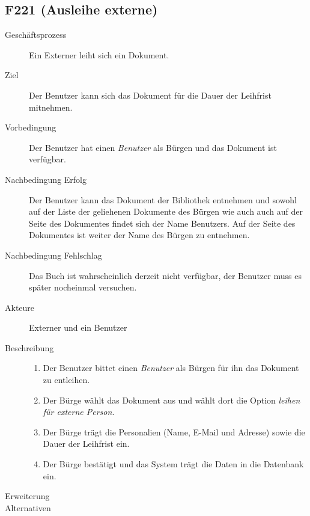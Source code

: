 \subsection{F221 (Ausleihe externe)}
\begin{description}
  \item[Geschäftsprozess]Ein Externer leiht sich ein Dokument.
  \item[Ziel]Der Benutzer kann sich das Dokument für die Dauer der Leihfrist mitnehmen.
  \item[Vorbedingung]Der Benutzer hat einen \emph{Benutzer} als Bürgen und das Dokument ist verfügbar.
  \item[Nachbedingung Erfolg]Der Benutzer kann das Dokument der Bibliothek entnehmen und sowohl auf der Liste der geliehenen Dokumente des Bürgen wie auch auch auf der Seite des Dokumentes findet sich der Name Benutzers. Auf der Seite des Dokumentes ist weiter der Name des Bürgen zu entnehmen.
  \item[Nachbedingung Fehlschlag]Das Buch ist wahrscheinlich derzeit nicht verfügbar, der Benutzer muss es später nocheinmal versuchen.
  \item[Akteure]Externer und ein Benutzer 
  \item[Beschreibung]\hfill
    \begin{enumerate}
      \item Der Benutzer bittet einen \emph{Benutzer} als Bürgen für ihn das Dokument zu entleihen.
      \item Der Bürge wählt das Dokument aus und wählt dort die Option \emph{leihen für externe Person}.
      \item Der Bürge trägt die Personalien (Name, E-Mail und Adresse) sowie die Dauer der Leihfrist ein.
      \item Der Bürge bestätigt und das System trägt die Daten in die Datenbank ein.
    \end{enumerate}
  \item[Erweiterung]
  \item[Alternativen]
\end{description}

